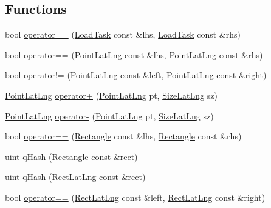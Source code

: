 \subsection*{\-Functions}
\begin{DoxyCompactItemize}
\item 
bool \hyperlink{group___o_p_map_widget_gad390d22cc7b9cc4af3c37661d580f900}{operator==} (\hyperlink{structinternals_1_1_load_task}{\-Load\-Task} const \&lhs, \hyperlink{structinternals_1_1_load_task}{\-Load\-Task} const \&rhs)
\item 
bool \hyperlink{group___o_p_map_widget_ga07dad6b9c91069f83e0e5a90ec53af87}{operator==} (\hyperlink{structinternals_1_1_point_lat_lng}{\-Point\-Lat\-Lng} const \&lhs, \hyperlink{structinternals_1_1_point_lat_lng}{\-Point\-Lat\-Lng} const \&rhs)
\item 
bool \hyperlink{group___o_p_map_widget_ga50aa89260018f2e102183443c663b4b4}{operator!=} (\hyperlink{structinternals_1_1_point_lat_lng}{\-Point\-Lat\-Lng} const \&left, \hyperlink{structinternals_1_1_point_lat_lng}{\-Point\-Lat\-Lng} const \&right)
\item 
\hyperlink{structinternals_1_1_point_lat_lng}{\-Point\-Lat\-Lng} \hyperlink{group___o_p_map_widget_ga0c71f763d92eeb6946eddcb6d939fddb}{operator+} (\hyperlink{structinternals_1_1_point_lat_lng}{\-Point\-Lat\-Lng} pt, \hyperlink{structinternals_1_1_size_lat_lng}{\-Size\-Lat\-Lng} sz)
\item 
\hyperlink{structinternals_1_1_point_lat_lng}{\-Point\-Lat\-Lng} \hyperlink{group___o_p_map_widget_ga6bd5d678b59611b56100b7558d386ba0}{operator-\/} (\hyperlink{structinternals_1_1_point_lat_lng}{\-Point\-Lat\-Lng} pt, \hyperlink{structinternals_1_1_size_lat_lng}{\-Size\-Lat\-Lng} sz)
\item 
bool \hyperlink{group___o_p_map_widget_ga21e50fddd3ab15ded36e81275f3cac32}{operator==} (\hyperlink{structinternals_1_1_rectangle}{\-Rectangle} const \&lhs, \hyperlink{structinternals_1_1_rectangle}{\-Rectangle} const \&rhs)
\item 
uint \hyperlink{group___o_p_map_widget_ga3b14f5cf9824e116a9b2dbd3aceaf7c3}{q\-Hash} (\hyperlink{structinternals_1_1_rectangle}{\-Rectangle} const \&rect)
\item 
uint \hyperlink{group___o_p_map_widget_gaa7f2cebba412ed2292d9e59299b7fd07}{q\-Hash} (\hyperlink{structinternals_1_1_rect_lat_lng}{\-Rect\-Lat\-Lng} const \&rect)
\item 
bool \hyperlink{group___o_p_map_widget_gae075f9b2f8b993dfd37de8f38ef1b72b}{operator==} (\hyperlink{structinternals_1_1_rect_lat_lng}{\-Rect\-Lat\-Lng} const \&left, \hyperlink{structinternals_1_1_rect_lat_lng}{\-Rect\-Lat\-Lng} const \&right)

\end{DoxyCompactItemize}
